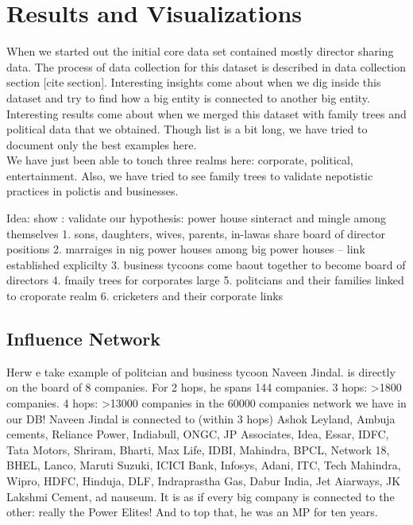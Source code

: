 \chapter{Results and Visualizations}

When we started out the initial core data set contained mostly director sharing data. The process of data collection for this dataset is described in data collection section [cite section]. Interesting insights come about when we dig inside this dataset and try to find how a big entity is connected to another big entity. \\

Interesting results come about when we merged this dataset with family trees and political data that we obtained.  Though list is a bit long, we have tried to document only the best examples here. \\

We have just been able to touch three realms here: corporate, political, entertainment.
Also, we have tried to see family trees to validate nepotistic practices in polictis and businesses.

Idea: show : validate our hypothesis: power house sinteract and mingle among themselves
1. sons, daughters, wives, parents, in-lawas share board of director positions
2. marraiges in nig power houses among big power houses -- link established explicilty
3. business tycoons come baout together to become board of directors
4. fmaily trees for corporates large
5. politcians and their families linked to croporate realm
6. cricketers and their corporate links


\section{Influence Network}

Herw e take example of politcian and business tycoon Naveen Jindal. is directly on the board of 8 companies. For 2 hops, he spans 144 companies. 3 hops: >1800 companies. 4 hops: >13000 companies in the 60000 companies network we have in our DB!  Naveen Jindal is connected to (within 3 hops) Ashok Leyland, Ambuja cements, Reliance Power, Indiabull, ONGC, JP Associates, Idea, Essar, IDFC, Tata Motors, Shriram, Bharti, Max Life, IDBI, Mahindra, BPCL, Network 18, BHEL, Lanco, Maruti Suzuki, ICICI Bank, Infosys, Adani, ITC, Tech Mahindra, Wipro, HDFC, Hinduja, DLF, Indraprastha Gas, Dabur India, Jet Aiarways, JK Lakshmi Cement, ad nauseum. It is as if every big company is connected to the other: really the Power Elites! And to top that, he was an MP for ten years.

